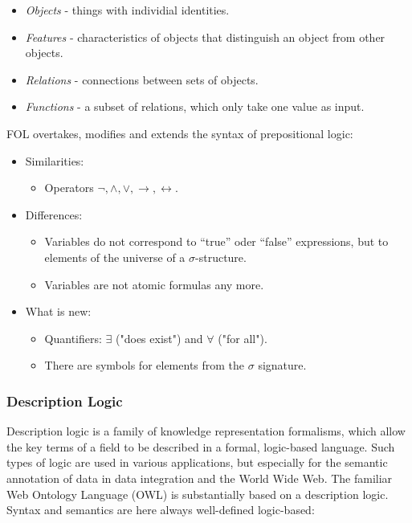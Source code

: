 \begin{itemize}
    \item \textit{Objects} - things with individial identities.
    \item \textit{Features} - characteristics of objects that distinguish an object from other objects.
    \item \textit{Relations} - connections between sets of objects.
    \item \textit{Functions} - a subset of relations, which only take one value as input.
\end{itemize}

FOL overtakes, modifies and extends the syntax of prepositional logic:
\begin{itemize}
    \item Similarities:
    \begin{itemize}
        \item Operators $\neg, \wedge, \vee, \rightarrow, \leftrightarrow$.
    \end{itemize}
    \item Differences:
    \begin{itemize}
        \item Variables do not correspond to “true” oder “false” expressions, but to elements of the universe of a  $\sigma$-structure.
        \item Variables are not atomic formulas any more.
    \end{itemize}
    \item What is new:
    \begin{itemize}
        \item Quantifiers: $\exists$ ("does exist") and $\forall$ ("for all").
        \item There are symbols for elements from the $\sigma$ signature.
    \end{itemize}
\end{itemize}
\subsubsection{Description Logic}
Description logic is a family of knowledge representation formalisms, which allow the key terms of a field to be described in a formal, logic-based language. Such types of logic are used in various applications, but especially for the semantic annotation of data in data integration and the World Wide Web. The familiar Web Ontology Language (OWL) is substantially based on a description logic. Syntax and semantics are here always well-defined logic-based:

